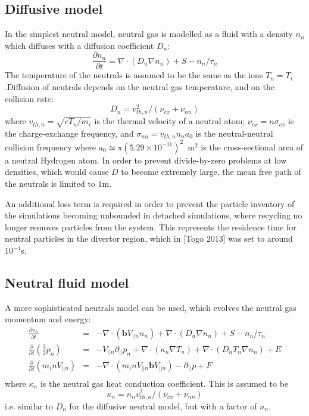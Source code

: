 \documentclass[12pt,a4paper]{article}
\newcommand{\bvec}{\mathbf{b}}
\begin{document}
\subsection{Diffusive model}

In the simplest neutral model, neutral gas is modelled as a fluid with a density $n_n$ which diffuses with a diffusion coefficient $D_n$:
\begin{equation}
 \frac{\partial n_n}{\partial t} = \nabla\cdot\left(D_n\nabla n_n\right) + S - n_n / \tau_n
\end{equation}
The temperature of the neutrals is assumed to be the same as the ions
$T_n = T_i$.Diffusion of neutrals depends on the neutral gas temperature, and on the collision rate:
\begin{equation}
D_n = v^2_{th,n} / \left(\nu_{cx} + \nu_{nn}\right)
\end{equation}
where $v_{th,n} = \sqrt{eT_n/m_i}$ is the thermal velocity of a neutral atom; $\nu_{cx} = n\sigma_{cx}$ is the charge-exchange
frequency, and $\sigma_{nn} = v_{th,n} n_n a_0$ is the neutral-neutral collision frequency 
where $a_0 \simeq \pi \left(5.29\times 10^{-11}\right)^2$~m$^2$ is the cross-sectional area of a neutral Hydrogen atom. In order to prevent divide-by-zero problems at low densities, which would cause $D$ to become extremely large,
the mean free path of the neutrals is limited to $1$m. 

An additional loss term is required in order to prevent the particle inventory of the simulations becoming unbounded in detached simulations, where recycling no longer removes particles from the system. This represents the
residence time for neutral particles in the divertor region, which in [Togo 2013] was set to around $10^{-4}$s.

\subsection{Neutral fluid model}

A more sophisticated neutrals model can be used, which evolves the neutral gas momentum and energy:
\begin{eqnarray*}
  \frac{\partial n_n}{\partial t} &=& - \nabla\cdot\left( \bvec V_{||n} n_n\right) + {\nabla\cdot\left(D_n\nabla n_n\right)} + S - n_n / \tau_n\\
  \frac{\partial}{\partial t}\left(\frac{3}{2}p_n\right) &=& -V_{||n}\partial_{||}p_n + \nabla\cdot\left(\kappa_n\nabla T_n\right) + \nabla\cdot\left(D_nT_n\nabla n_n\right) + E \\
  \frac{\partial}{\partial t}\left(m_i nV_{||n}\right) &=& -\nabla\cdot\left(m_inV_{||n}\bvec V_{||n}\right) - \partial_{||} p + F\\
\end{eqnarray*}
where $\kappa_n$ is the neutral gas heat conduction coefficient. This is assumed to be
\[
\kappa_n = n_n v_{th,n}^2 / \left(\nu_{cx} + \nu_{nn}\right)
\]
i.e. similar to $D_n$ for the diffusive neutral model, but with a factor of $n_n$.
\end{document}
